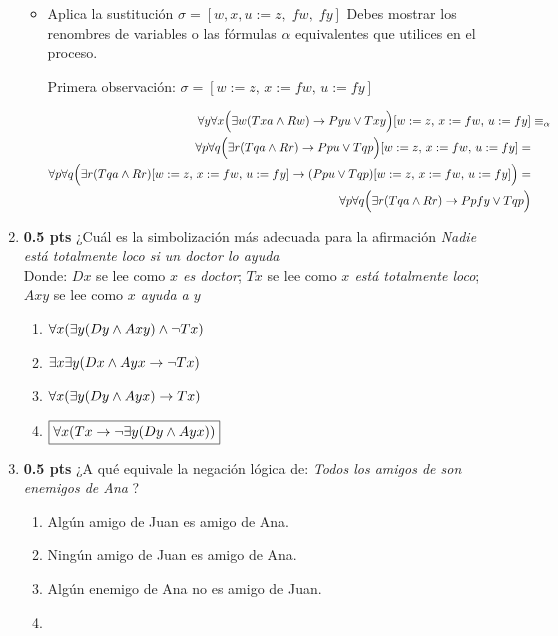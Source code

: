 \documentclass[11pt,letterpaper]{article}
\begin{document}
\begin{enumerate}
\begin{itemize}
  \item Aplica la sustitución 
    $\sigma = [w,x,u := z,\;fw,\;fy]$ 
    Debes mostrar los renombres de variables o las f\'ormulas $\alpha$
    equivalentes que utilices en el proceso.

    Primera observación:
    $\sigma = [w:= z,\, x:= fw,\, u := fy]$

    \begin{align*}
      \forall y \forall x \Big(\exists w (Txa \land Rw) \rightarrow Pyu 
      \lor Txy \Big)[w:= z,\, x:= fw,\, u := fy] &\equiv_\alpha\\
      \forall p \forall q \Big(\exists r (Tqa \land Rr) \rightarrow Ppu 
      \lor Tqp \Big)[w:= z,\, x:= fw,\, u := fy] = \\
      \forall p \forall q \Big(\exists
      r (Tqa \land Rr)[w:= z,\, x:= fw,\, u := fy] \rightarrow (Ppu 
      \lor Tqp)[w:= z,\, x:= fw,\, u := fy] \Big) = \\
      \forall p \forall q \Big(\exists r (Tqa \land Rr) \rightarrow Ppfy 
        \lor Tqp \Big)
    \end{align*}
    
  \end{itemize}

  \bigskip
\item {\bf 0.5 pts}  ¿Cuál es la simbolización más adecuada para la 
  afirmación
  \textit{Nadie está totalmente loco si un doctor lo ayuda}\\
  Donde: $Dx$ se lee como \textit{$x$ es doctor}; $Tx$ se lee como \textit{$x$ 
    está totalmente loco}; $Axy$ se lee como \textit{$x$ ayuda a $y$}
  \begin{enumerate}
    \item $\forall x (\exists y(Dy \land  Axy) \land  \lnot Tx)$
    \item $ \exists x \exists y (Dx \land  Ayx \to  \lnot Tx)$
    \item $\forall x (\exists y(Dy \land  Ayx) \to  Tx)$
    \item $\boxed{\forall x (Tx \to  \lnot \exists y( Dy \land  Ayx))}$
  \end{enumerate}
  
  \bigskip
\item {\bf 0.5 pts}  ¿A qué equivale la negación lógica de:
  \textit{Todos los amigos de son enemigos de Ana} ?
  \begin{enumerate}
  \item  Algún amigo de Juan es amigo de Ana.
  \item  Ningún amigo de Juan es amigo de Ana.
  \item  Algún enemigo de Ana no es amigo de Juan.
  \item  {}
  \end{enumerate}
  \bigskip


\end{enumerate}
\end{document}
